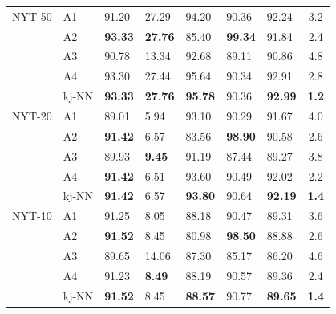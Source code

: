 \begin{table}[ht]
\begin{tabularx}{\columnwidth}{XXXXXXX|c}
NYT-50   & A1    & 91.20  & 27.29 & 94.20  & 90.36       & 92.24 & 3.2  \\
          & A2    & \bfseries93.33  & \bfseries27.76 & 85.40  & \bfseries99.34       & 91.84 & 2.4  \\
          & A3    & 90.78  & 13.34 & 92.68  & 89.11       & 90.86 & 4.8  \\
          & A4    & 93.30  & 27.44 & 95.64  & 90.34       & 92.91 & 2.8  \\
          & \gls{kj-NN} & \bfseries93.33  & \bfseries27.76 & \bfseries95.78  & 90.36       & \bfseries92.99 & \bfseries1.2  \\  \midrule
NYT-20   & A1    & 89.01  & 5.94  & 93.10  & 90.29       & 91.67 & 4.0    \\
          & A2    & \bfseries91.42  & 6.57  & 83.56  & \bfseries98.90       & 90.58 & 2.6  \\
          & A3    & 89.93  & \bfseries9.45  & 91.19  & 87.44       & 89.27 & 3.8  \\
          & A4    & \bfseries91.42  & 6.51  & 93.60  & 90.49       & 92.02 & 2.2    \\
          & \gls{kj-NN} & \bfseries91.42  & 6.57  & \bfseries93.80  & 90.64       & \bfseries92.19 & \bfseries1.4  \\ \midrule
NYT-10   & A1    & 91.25  & 8.05  & 88.18  & 90.47       & 89.31 & 3.6  \\
          & A2    & \bfseries91.52  & 8.45  & 80.98  & \bfseries98.50       & 88.88 & 2.6  \\
          & A3    & 89.65  & 14.06 & 87.30  & 85.17       & 86.20 & 4.6  \\
          & A4    & 91.23  & \bfseries8.49  & 88.19  & 90.57       & 89.36 & 2.4  \\
          & \gls{kj-NN} & \bfseries91.52  & 8.45  & \bfseries88.57  & 90.77       & \bfseries89.65 & \bfseries1.4  \\ 
 \bottomrule
\end{tabularx}
\end{table} 

